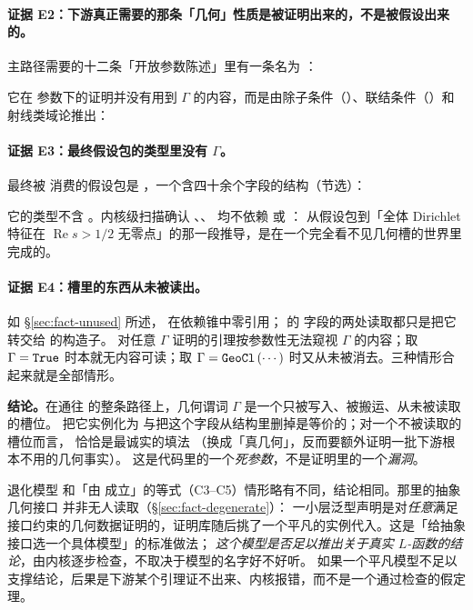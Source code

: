 \paragraph{证据 E2：下游真正需要的那条「几何」性质是被证明出来的，不是被假设出来的。}
主路径需要的十二条「开放参数陈述」里有一条名为 ：


它在  参数下的证明并没有用到 $\Gamma$ 的内容，而是由除子条件（）、联结条件（）和射线类域论推出：


\paragraph{证据 E3：最终假设包的类型里没有 $\Gamma$。}
最终被  消费的假设包是 ，一个含四十余个字段的结构（节选）：


它的类型不含 。内核级扫描确认 、、 均不依赖  或 ：
从假设包到「全体 Dirichlet 特征在 $\operatorname{Re} s>1/2$ 无零点」的那一段推导，是在一个完全看不见几何槽的世界里完成的。

\paragraph{证据 E4：槽里的东西从未被读出。}
如 \S\ref{sec:fact-unused} 所述， 在依赖锥中零引用； 的  字段的两处读取都只是把它转交给  的构造子。
对任意 $\Gamma$ 证明的引理按参数性无法窥视 $\Gamma$ 的内容；取 $\Gamma=\text{\texttt{True}}$ 时本就无内容可读；取 $\Gamma = \text{\texttt{GeoCl}}\,(\cdots)$ 时又从未被消去。三种情形合起来就是全部情形。

\begin{verdictbox}
\textbf{结论。}在通往  的整条路径上，几何谓词 $\Gamma$ 是一个只被写入、被搬运、从未被读取的槽位。
把它实例化为  与把这个字段从结构里删掉是等价的；对一个不被读取的槽位而言， 恰恰是最诚实的填法
（换成「真几何」，反而要额外证明一批下游根本不用的几何事实）。
这是代码里的一个\emph{死参数}，不是证明里的一个\emph{漏洞}。

退化模型  和「由  成立」的等式（C3–C5）情形略有不同，结论相同。那里的抽象几何接口  并非无人读取（\S\ref{sec:fact-degenerate}）：
一小层泛型声明是对\emph{任意}满足接口约束的几何数据证明的，证明库随后挑了一个平凡的实例代入。这是「给抽象接口选一个具体模型」的标准做法；
\emph{这个模型是否足以推出关于真实 $L$-函数的结论}，由内核逐步检查，不取决于模型的名字好不好听。
如果一个平凡模型不足以支撑结论，后果是下游某个引理证不出来、内核报错，而不是一个通过检查的假定理。
\end{verdictbox}

